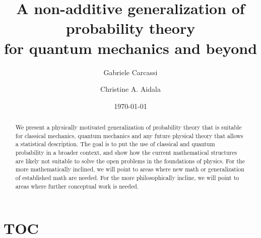 \documentclass[10pt,twocolumn, nofootinbib]{revtex4-2}
\begin{document}
\title{A non-additive generalization of probability theory \\for quantum mechanics and beyond}
\author{Gabriele Carcassi}
\author{Christine A. Aidala}

\date{\today}


\begin{abstract}
	We present a physically motivated generalization of probability theory that is suitable for classical mechanics, quantum mechanics and any future physical theory that allows a statistical description. The goal is to put the use of classical and quantum probability in a broader context, and show how the current mathematical structures are likely not suitable to solve the open problems in the foundations of physics. For the more mathematically inclined, we will point to areas where new math or generalization of established math are needed. For the more philosophically incline, we will point to areas where further conceptual work is needed.
	
	
\end{abstract}

\maketitle

\section{TOC}
\end{document}

